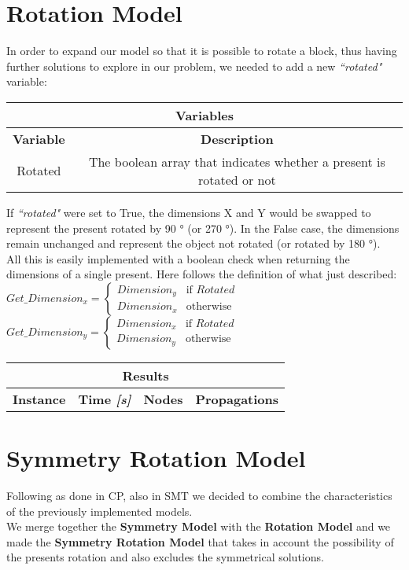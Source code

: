 \section{Rotation Model}
In order to expand our model so that it is possible to rotate a block, thus having further solutions to explore in our problem, we needed to add a new \textit{``rotated"} variable:
\begin{center}
		\begin{tabular}{|c|c|}
			\hline
			\multicolumn{2}{|c|}{\textbf{Variables}} \\
			\hline
			\textbf{Variable} & {\textbf{Description}} \\
			\hline
			Rotated & The boolean array that indicates whether a present is rotated or not \\
			\hline
		\end{tabular}
\end{center}
If \textit{``rotated"} were set to True, the dimensions X and Y would be swapped to represent the present rotated by 90 ° (or 270 °). In the False case, the dimensions remain unchanged and represent the object not rotated (or rotated by 180 °). \\
All this is easily implemented with a boolean check when returning the dimensions of a single present.
Here follows the definition of what just described:\\
$
Get\_Dimension_x = 
\begin{cases}
	Dimension_y & \text{if } Rotated \\
	Dimension_x & \text{otherwise}
\end{cases}
$
\\
$
Get\_Dimension_y = 
\begin{cases}
	Dimension_x & \text{if } Rotated \\
	Dimension_y & \text{otherwise}
\end{cases}
$

\begin{center}
    \begin{tabular}{|c|c|c|c|}
        \hline
        \multicolumn{4}{|c|}{\textbf{Results}} \\
        \hline
        \textbf{Instance} & \textbf{Time \textit{[s]}} & \textbf{Nodes} & \textbf{Propagations} \\
        \hline
    \end{tabular}
\end{center}

\section{Symmetry Rotation Model}
Following as done in CP, also in SMT we decided to combine the characteristics of the previously implemented models.\\
We merge together the \textbf{Symmetry Model} with the \textbf{Rotation Model} and we made
the \textbf{Symmetry Rotation Model} that takes in account the possibility of the presents rotation and also excludes the symmetrical
solutions.

